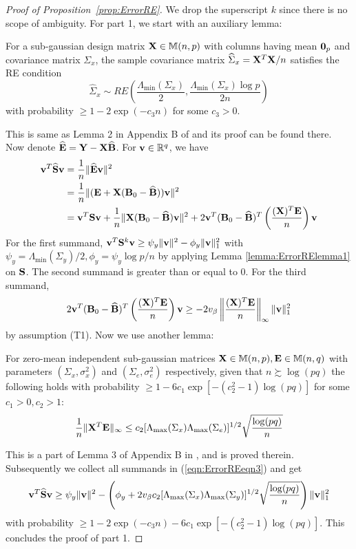 \documentclass[12pt, letterpaper]{article}
\numberwithin{equation}{section}
\begin{document}
\begin{proof}[Proof of Proposition~\ref{prop:ErrorRE}]
We drop the superscript $k$ since there is no scope of ambiguity. For part 1, we start with an auxiliary lemma:
%
\begin{Lemma}\label{lemma:ErrorRElemma1}
For a sub-gaussian design matrix ${\mathbf{X}} \in {\mathbb{M}}(n,p)$ with columns having mean ${\bf 0}_p$ and covariance matrix $\Sigma_x$, the sample covariance matrix $\widehat \Sigma_x = {\mathbf{X}}^T {\mathbf{X}}/n$ satisfies the RE condition
%
$$
\widehat \Sigma_x \sim RE \left( \frac{\Lambda_{\min} ( \Sigma_x) }{2}, \frac{\Lambda_{\min} ( \Sigma_x) \log p }{2 n} \right)
$$
%
with probability $\geq 1 - 2 \exp(-c_3 n)$ for some $c_3 > 0$.
\end{Lemma}
%
This is same as Lemma 2 in Appendix B of \cite{LinEtal16} and its proof can be found there. Now denote $\widehat {{\mathbf{E}}} = {\mathbf{Y}} - {\mathbf{X}} \widehat {{\mathbf{B}}}$. For ${\bf{v}} \in {\mathbb{R}}^q$, we have
%
\begin{align}\label{eqn:ErrorREeqn3}
{\bf{v}}^T \widehat {{\mathbf{S}}} {\bf{v}} &= \frac{1}{n} \| \widehat {{\mathbf{E}}} {\bf{v}} \|^2 \notag\\
&= \frac{1}{n} \| ({\mathbf{E}} + {\mathbf{X}} ( {\mathbf{B}}_0 - \widehat {{\mathbf{B}}} )){\bf{v}} \|^2 \notag\\
&= {\bf{v}}^T {\mathbf{S}} {\bf{v}} + \frac{1}{n} \| {\mathbf{X}} ({\mathbf{B}}_0 - \widehat {{\mathbf{B}}}) {\bf{v}} \|^2 + 2 {\bf{v}}^T ({\mathbf{B}}_0 - \widehat {{\mathbf{B}}})^T \left( \frac {({\mathbf{X}})^T {\mathbf{E}}}{n} \right) {\bf{v}}
\end{align}
%
For the first summand, $ {\bf{v}}^T {\mathbf{S}}^k {\bf{v}} \geq \psi_y \| {\bf{v}} \|^2 - \phi_y \| {\bf{v}} \|_1^2$ with $\psi_y = \Lambda_{\min} (\Sigma_y)/2, \phi_y = \psi_y \log p/n$ by applying Lemma \ref{lemma:ErrorRElemma1} on ${\mathbf{S}}$. The second summand is greater than or equal to 0. For the third summand,
%
$$
2 {\bf{v}}^T ({\mathbf{B}}_0 - \widehat {{\mathbf{B}}})^T \left( \frac {({\mathbf{X}})^T {\mathbf{E}}}{n} \right) {\bf{v}} \geq
-2 v_\beta \left\| \frac {({\mathbf{X}})^T {\mathbf{E}}}{n} \right\|_\infty \| {\bf{v}} \|_1^2
$$
%
by assumption (T1). Now we use another lemma:
%
\begin{Lemma}\label{lemma:ErrorRElemma2}
For zero-mean independent sub-gaussian matrices ${\mathbf{X}} \in {\mathbb{M}}(n,p), {\mathbf{E}} \in {\mathbb{M}}(n,q)$ with parameters $(\Sigma_x, \sigma_x^2)$ and $(\Sigma_e, \sigma_e^2)$ respectively, given that $n \succsim \log(pq)$ the following holds with probability $\geq 1 - 6c_1 \exp [-(c_2^2-1) \log(pq)]$ for some $c_1 >0, c_2 > 1$:
%
$$
\frac{1}{n} \| {\mathbf{X}}^T {\mathbf{E}} \|_\infty \leq c_2 [ \Lambda_{\max} (\Sigma_x) \Lambda_{\max} (\Sigma_e) ]^{1/2} \sqrt{\frac{ \log(pq)}{n}}
$$
%
\end{Lemma}
%
This is a part of Lemma 3 of Appendix B in \cite{LinEtal16}, and is proved therein. Subsequently we collect all summands in (\ref{eqn:ErrorREeqn3}) and get
%
$$
{\bf{v}}^T \widehat{ {\mathbf{S}}} {\bf{v}} \geq \psi_y \| {\bf{v}} \|^2 - \left( \phi_y + 2 v_\beta c_2 [ \Lambda_{\max} (\Sigma_x) \Lambda_{\max} (\Sigma_y) ]^{1/2} \sqrt{\frac{ \log(pq)}{n}} \right) \| {\bf{v}} \|_1^2
$$
with probability $\geq 1 - 2\exp(- c_3 n) - 6c_1 \exp [-(c_2^2-1) \log(pq)]$. This concludes the proof of part 1.


\end{proof}
\end{document}
